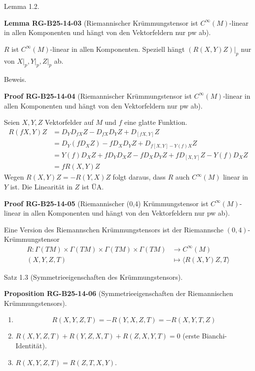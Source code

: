 \documentclass[10pt, letterpaper]{article}
\newcommand{\CustomHeading}[3]{%
  \par\medskip\noindent%
  \textbf{#1 #2} \textnormal{(#3)}.\enskip%
}
\newenvironment{PROP}[2]{\begin{unitbox}\CustomHeading{Proposition}{#1}{#2}}{\end{unitbox}}
\newenvironment{LEM}[2]{\begin{unitbox}\CustomHeading{Lemma}{#1}{#2}}{\end{unitbox}}
\newenvironment{PROOF}[2]{\begin{unitbox}\CustomHeading{Proof}{#1}{#2}}{\end{unitbox}}
\begin{document}
Lemma 1.2. 


\begin{LEM}{RG-B25-14-03}{Riemannischer Krümmungstensor ist $C^\infty(M)$-linear in allen Komponenten und hängt von den Vektorfeldern nur pw ab}
$R$ ist $C^{\infty}(M)$-linear in allen Komponenten. Speziell hängt $\left.(R(X, Y) Z)\right|_{p}$ nur von $\left.X\right|_{p},\left.Y\right|_{p},\left.Z\right|_{p}$ ab.
\end{LEM}


Beweis. 


\begin{PROOF}{RG-B25-14-04}{Riemannischer Krümmungstensor ist $C^\infty(M)$-linear in allen Komponenten und hängt von den Vektorfeldern nur pw ab}
Seien $X, Y, Z$ Vektorfelder auf $M$ und $f$ eine glatte Funktion.
$$
\begin{aligned}
R(f X, Y) Z & =D_{Y} D_{f X} Z-D_{f X} D_{Y} Z+D_{[f X, Y]} Z \\
& =D_{Y}\left(f D_{X} Z\right)-f D_{X} D_{Y} Z+D_{f[X, Y]-Y(f) X} Z \\
& =Y(f) D_{X} Z+f D_{Y} D_{X} Z-f D_{X} D_{Y} Z+f D_{[X, Y]} Z-Y(f) D_{X} Z \\
& =f R(X, Y) Z
\end{aligned}
$$
Wegen $R(X, Y) Z=-R(Y, X) Z$ folgt daraus, dass $R$ auch $C^{\infty}(M)$ linear in $Y$ ist. Die Linearität in $Z$ ist ÜA.
\end{PROOF}


\begin{PROOF}{RG-B25-14-05}{Riemannischer (0,4) Krümmungstensor ist $C^\infty(M)$-linear in allen Komponenten und hängt von den Vektorfeldern nur pw ab}
Eine Version des Riemannschen Krümmungstensors ist der Riemannsche $(0,4)$-Krümmungstensor
$$
\begin{aligned}
R: \Gamma(T M) \times \Gamma(T M) \times \Gamma(T M) \times \Gamma(T M) & \rightarrow C^{\infty}(M) \\
(X, Y, Z, T) & \mapsto\langle R(X, Y) Z, T\rangle
\end{aligned}
$$
\end{PROOF}



Satz 1.3 (Symmetrieeigenschaften des Krümmungstensors).



\begin{PROP}{RG-B25-14-06}{Symmetrieeigenschaften der Riemannischen Krümmungstensors}
\begin{enumerate}
  \item 
  \begin{equation}
  R(X, Y, Z, T) = -R(Y, X, Z, T) = -R(X, Y, T, Z) \tag{1}
  \end{equation}

  \item $R(X, Y, Z, T) + R(Y, Z, X, T) + R(Z, X, Y, T) = 0$ \quad (erste Bianchi-Identität).

  \item $R(X, Y, Z, T) = R(Z, T, X, Y)$.
\end{enumerate}
\end{PROP}
\end{document}
